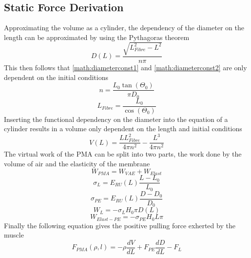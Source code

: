 \documentclass[11pt,a4paper]{article}
\begin{document}
\newpage
\begin{appendices}
\section{Static Force Derivation}
\label{sub:staticforcederive}
Approximating the volume as a cylinder, the dependency of the diameter on the length can be approximated by using the Pythagoras theorem 
\begin{equation}
    D(L) = \frac{\sqrt{L_{Fibre}^2-L^2}}{n \pi}
\end{equation}
This then follows that \cref{math:diameterconst1} and \cref{math:diameterconst2} are only dependent on the initial conditions
\begin{equation}
    n = \frac{L_0\tan(\Theta_0)}{\pi D_0}
    \label{math:diameterconst1}
\end{equation}
\begin{equation}
    L_{Fibre} = \frac{L_0}{\cos(\Theta_0)}
    \label{math:diameterconst2}
\end{equation}
Inserting the functional dependency on the diameter into the equation of a cylinder results in a volume only dependent on the length and initial conditions
\begin{equation}
    V(L) = \frac{L L_{Fibre}^2}{4 \pi n^2}-\frac{L^3}{4 \pi n^2}
\end{equation}
The virtual work of the PMA can be split into two parts, the work done by the volume of air and the elasticity of the membrane 
\begin{equation}
    W_{PMA} = W_{VAE} + W_{Elast}
\end{equation}
\begin{equation}
    \sigma_{L} = E_{RU}(L) \frac{L-L_0}{L_0}
\end{equation}
\begin{equation}
    \sigma_{PE} = E_{RU}(L) \frac{D-D_0}{D_0}
\end{equation}
\begin{equation}
    W_{L} = -\sigma_{L} H_0 \pi D(L)
\end{equation}
\begin{equation}
    W_{Elast-PE} = -\sigma_{PE} H_0 L \pi
\end{equation}
Finally the following equation gives the positive pulling force exherted by the muscle
\begin{equation}
    F_{PMA}(\rho, l) = -\rho \frac{dV}{dL}+F_{PE} \frac{dD}{dL}-F_L
    \label{math:staticforcederive}
\end{equation}
\newpage


\end{appendices}
\end{document}
